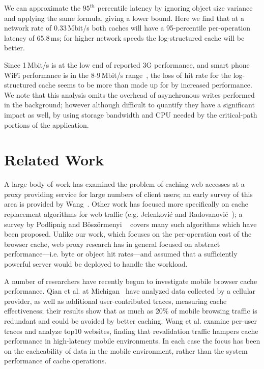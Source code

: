 \documentclass[letterpaper,twocolumn,10pt]{article}
\begin{document}
We can approximate the $95^{th}$ percentile latency by ignoring object size
variance and applying the same formula, giving a lower bound. Here we find that
at a network rate of 0.33\,Mbit/s both caches will have a 95-percentile
per-operation latency of 65.8\,ms; for higher network speeds the log-structured
cache will be better.

Since 1\,Mbit/s is at the low end of reported 3G performance, and smart phone
WiFi performance is in the 8-9\,Mbit/s range~\cite{kim12}, the loss of hit rate
for the log-structured cache seems to be more than made up for by increased
performance. We note that this analysis omits the overhead of asynchronous
writes performed in the background; however although difficult to quantify they
have a significant impact as well, by using storage bandwidth and CPU needed by
the critical-path portions of the application.

\section{Related Work}
A large body of work has examined the problem of caching web accesses at a proxy
providing service for large numbers of client users; an early survey of this
area is provided by Wang~\cite{wang_survey_1999}. Other work has focused more
specifically on cache replacement algorithms for web traffic
(e.g. Jelenkovi\'{c} and Radovanovi\'{c}~\cite{Jelenkovic_optimizing_2004}); a
survey by Podlipnig and B\"{o}sz\"{o}rmenyi ~\cite{podlipnig_survey_2003} covers
many such algorithms which have been proposed. Unlike our work, which focuses on
the per-operation cost of the browser cache, web proxy research has in general
focused on abstract performance---i.e. byte or object hit rates---and assumed
that a sufficiently powerful server would be deployed to handle the workload.

A number of researchers have recently begun to investigate mobile browser cache
performance. Qian et al. at Michigan~\cite{qian_web_2012} have analyzed data
collected by a cellular provider, as well as additional user-contributed traces,
measuring cache effectiveness; their results show that as much as 20\% of mobile
browsing traffic is redundant and could be avoided by better caching. Wang et
al. \cite{wang_how_2011} examine per-user traces and analyze top10 websites,
finding that revalidation traffic hampers cache performance in high-latency
mobile environments. In each case the focus has been on the cacheability of data
in the mobile environment, rather than the system performance of cache
operations.
\end{document}
